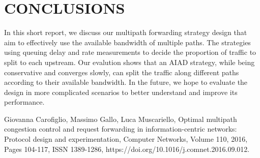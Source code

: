 \documentclass[letterpaper, 10 pt, conference]{ieeeconf}  %
\begin{document}
\section{CONCLUSIONS}\label{sec:c}
In this short report, we discuss our multipath forwarding strategy design that aim to effectively use the available bandwidth of multiple paths. The strategies using queuing delay and rate measurements to decide the proportion of traffic to split to each upstream. Our evalution shows that an AIAD strategy, while being conservative and converges slowly, can split the traffic along different paths according to their available bandwidth. In the future, we hope to evaluate the design in more complicated scenarios to better understand and improve its performance.




\addtolength{\textheight}{-12cm}  


\begin{thebibliography}{99}

Giovanna Carofiglio, Massimo Gallo, Luca Muscariello,
Optimal multipath congestion control and request forwarding in information-centric networks: Protocol design and experimentation,
Computer Networks,
Volume 110,
2016,
Pages 104-117,
ISSN 1389-1286,
https://doi.org/10.1016/j.comnet.2016.09.012.
 
\end{thebibliography}
\end{document}
